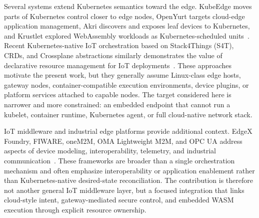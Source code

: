 Several systems extend Kubernetes semantics toward the edge. KubeEdge moves parts of Kubernetes control closer to edge nodes, OpenYurt targets cloud-edge application management, Akri discovers and exposes leaf devices to Kubernetes, and Krustlet explored WebAssembly workloads as Kubernetes-scheduled units~\cite{kubeedge,openyurt,akri,krustlet}. Recent Kubernetes-native IoT orchestration based on Stack4Things (S4T), CRDs, and Crossplane abstractions similarly demonstrates the value of declarative resource management for IoT deployments~\cite{dagati_iot_orchestration_s4t}.  These approaches motivate the present work, but they generally assume Linux-class edge hosts, gateway nodes, container-compatible execution environments, device plugins, or platform services attached to capable nodes. The target considered here is narrower and more constrained: an embedded endpoint that cannot run a kubelet, container runtime, Kubernetes agent, or full cloud-native network stack.

IoT middleware and industrial edge platforms provide additional context. EdgeX Foundry, FIWARE, oneM2M, OMA Lightweight M2M, and OPC UA address aspects of device modeling, interoperability, telemetry, and industrial communication~\cite{edgex,fiware,onem2m,lwm2m,opcua}. These frameworks are broader than a single orchestration mechanism and often emphasize interoperability or application enablement rather than Kubernetes-native desired-state reconciliation. The contribution is therefore not another general IoT middleware layer, but a focused integration that links cloud-style intent, gateway-mediated secure control, and embedded WASM execution through explicit resource ownership.


